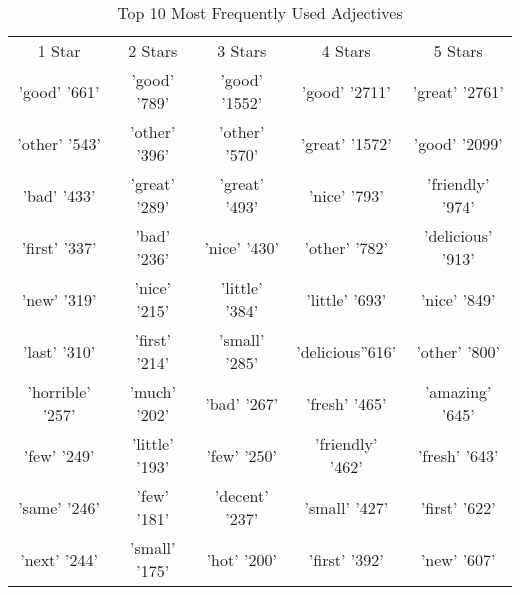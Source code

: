     \begin{center}
        \tiny
        \begin{table}[!h]
        \caption{Top 10 Most Frequently Used Adjectives}
            \begin{tabular}{c c c c c}
                1 Star & 2 Stars & 3 Stars & 4 Stars & 5 Stars\\
                'good' '661' & 'good' '789' & 'good' '1552' & 'good' '2711' & 'great' '2761'\\
                'other' '543' & 'other' '396' & 'other' '570' & 'great' '1572' & 'good' '2099'\\
                'bad' '433' & 'great' '289' & 'great' '493' & 'nice' '793' & 'friendly' '974'\\
                'first' '337' & 'bad' '236' & 'nice' '430' & 'other' '782' & 'delicious' '913'\\
                'new' '319' & 'nice' '215' & 'little' '384' & 'little' '693' & 'nice' '849'\\
                'last' '310' & 'first' '214' & 'small' '285' & 'delicious''616' & 'other' '800'\\
                'horrible' '257' & 'much' '202' & 'bad' '267' & 'fresh' '465' & 'amazing' '645'\\
                'few' '249' & 'little' '193' & 'few' '250' & 'friendly' '462' & 'fresh' '643'\\
                'same' '246' & 'few' '181' & 'decent' '237' & 'small' '427' & 'first' '622'\\
                'next' '244' & 'small' '175' & 'hot' '200' & 'first' '392' & 'new' '607'\\
                 
            \end{tabular}
        \end{table}
    \end{center}
    
